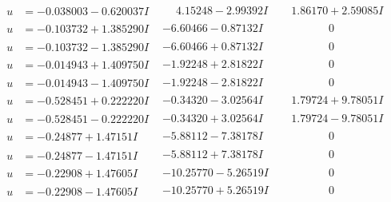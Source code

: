 \documentclass[1p]{elsarticle_modified}
\theoremstyle{definition}
\begin{document}
$$\begin{array}{c|c|c}
\begin{aligned}
u &= -0.038003 - 0.620037 I\end{aligned}
 & \phantom{-}4.15248 - 2.99392 I & \phantom{-}1.86170 + 2.59085 I \\ \hline\begin{aligned}
u &= -0.103732 + 1.385290 I\end{aligned}
 & -6.60466 - 0.87132 I & \phantom{-0.000000 } 0 \\ \hline\begin{aligned}
u &= -0.103732 - 1.385290 I\end{aligned}
 & -6.60466 + 0.87132 I & \phantom{-0.000000 } 0 \\ \hline\begin{aligned}
u &= -0.014943 + 1.409750 I\end{aligned}
 & -1.92248 + 2.81822 I & \phantom{-0.000000 } 0 \\ \hline\begin{aligned}
u &= -0.014943 - 1.409750 I\end{aligned}
 & -1.92248 - 2.81822 I & \phantom{-0.000000 } 0 \\ \hline\begin{aligned}
u &= -0.528451 + 0.222220 I\end{aligned}
 & -0.34320 - 3.02564 I & \phantom{-}1.79724 + 9.78051 I \\ \hline\begin{aligned}
u &= -0.528451 - 0.222220 I\end{aligned}
 & -0.34320 + 3.02564 I & \phantom{-}1.79724 - 9.78051 I \\ \hline\begin{aligned}
u &= -0.24877 + 1.47151 I\end{aligned}
 & -5.88112 - 7.38178 I & \phantom{-0.000000 } 0 \\ \hline\begin{aligned}
u &= -0.24877 - 1.47151 I\end{aligned}
 & -5.88112 + 7.38178 I & \phantom{-0.000000 } 0 \\ \hline\begin{aligned}
u &= -0.22908 + 1.47605 I\end{aligned}
 & -10.25770 - 5.26519 I & \phantom{-0.000000 } 0 \\ \hline\begin{aligned}
u &= -0.22908 - 1.47605 I\end{aligned}
 & -10.25770 + 5.26519 I & \phantom{-0.000000 } 0 \\ \hline\begin{aligned}

\end{aligned}
\end{array}$$
\end{document}
